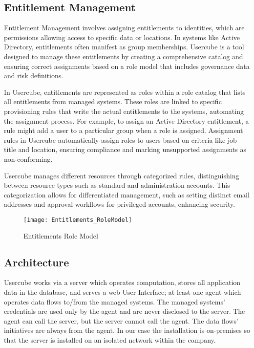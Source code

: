 \subsection{Entitlement Management}

Entitlement Management involves assigning entitlements to identities, which are permissions allowing access to specific data or locations. In systems like Active Directory, entitlements often manifest as group memberships. Usercube is a tool designed to manage these entitlements by creating a comprehensive catalog and ensuring correct assignments based on a role model that includes governance data and risk definitions.

In Usercube, entitlements are represented as roles within a role catalog that lists all entitlements from managed systems. These roles are linked to specific provisioning rules that write the actual entitlements to the systems, automating the assignment process. For example, to assign an Active Directory entitlement, a rule might add a user to a particular group when a role is assigned. Assignment rules in Usercube automatically assign roles to users based on criteria like job title and location, ensuring compliance and marking unsupported assignments as non-conforming.

Usercube manages different resources through categorized rules, distinguishing between resource types such as standard and administration accounts. This categorization allows for differentiated management, such as setting distinct email addresses and approval workflows for privileged accounts, enhancing security.

\begin{figure}[htbp]
  \centering
  \texttt{[image: Entitlements\_RoleModel]}
  \caption{Entitlements Role Model}
  \label{fig:Entitlements_RoleModel}
\end{figure}

\subsection{Architecture}

Usercube works via a server which operates computation, stores all application data in the database, and serves a web User Interface; at least one agent which operates data flows to/from the managed systems. The managed systems' credentials are used only by the agent and are never disclosed to the server. The agent can call the server, but the server cannot call the agent. The data flows' initiatives are always from the agent. In our case the installation is on-premises so that the server is installed on an isolated network within the company.

